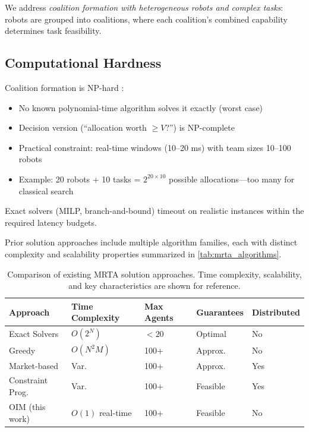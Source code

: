 We address \textit{coalition formation with heterogeneous robots and complex tasks}: robots are grouped into coalitions, where each coalition's combined capability determines task feasibility.

\subsection{Computational Hardness}

Coalition formation is NP-hard \cite{Sandholm2002}:
\begin{itemize}
\item No known polynomial-time algorithm solves it exactly (worst case)
\item Decision version (``allocation worth $\geq V$?'') is NP-complete
\item Practical constraint: real-time windows (10--20 ms) with team sizes 10--100 robots
\item Example: 20 robots + 10 tasks = $2^{20 \times 10}$ possible allocations---too many for classical search
\end{itemize}

Exact solvers (MILP, branch-and-bound) timeout on realistic instances within the required latency budgets.

Prior solution approaches include multiple algorithm families, each with distinct complexity and scalability properties summarized in \autoref{tab:mrta_algorithms}.

\begin{table}[!htpb]
    \caption[MRTA Algorithm Comparison]{Comparison of existing MRTA solution approaches. Time complexity, scalability, and key characteristics are shown for reference.}
    \label{tab:mrta_algorithms}
    \centering
    \begin{tabular}{lllll}
    \toprule
    \textbf{Approach} & \textbf{Time Complexity} & \textbf{Max Agents} & \textbf{Guarantees} & \textbf{Distributed} \\ \midrule
    Exact Solvers     & $O(2^N)$         & $<20$    & Optimal    & No  \\
    Greedy            & $O(N^2M)$        & 100+     & Approx.    & No  \\
    Market-based      & Var.             & 100+     & Approx.    & Yes \\
    Constraint Prog.  & Var.             & 100+     & Feasible   & Yes \\
    OIM (this work)   & $O(1)$ real-time & 100+     & Feasible   & No  \\
    \bottomrule
    \end{tabular}
\end{table}


